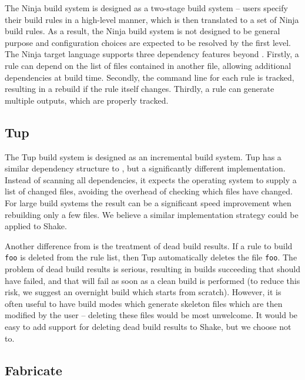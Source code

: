 
The Ninja build system \cite{ninja} is designed as a two-stage build system -- users specify their build rules in a high-level manner, which is then translated to a set of Ninja build rules. As a result, the Ninja build system is not designed to be general purpose and configuration choices are expected to be resolved by the first level. The Ninja target language supports three dependency features beyond \make{}. Firstly, a rule can depend on the list of files contained in another file, allowing additional dependencies at build time. Secondly, the command line for each rule is tracked, resulting in a rebuild if the rule itself changes. Thirdly, a rule can generate multiple outputs, which are properly tracked.

\subsection{Tup}


The Tup build system \cite{tup} is designed as an incremental build system. Tup has a similar dependency structure to \make{}, but a significantly different implementation. Instead of scanning all dependencies, it expects the operating system to supply a list of changed files, avoiding the overhead of checking which files have changed. For large build systems the result can be a significant speed improvement when rebuilding only a few files. We believe a similar implementation strategy could be applied to Shake.

Another difference from \make{} is the treatment of dead build results. If a rule to build \texttt{foo} is deleted from the rule list, then Tup automatically deletes the file \texttt{foo}. The problem of dead build results is serious, resulting in builds succeeding that should have failed, and that will fail as soon as a clean build is performed (to reduce this risk, we suggest an overnight build which starts from scratch). However, it is often useful to have build modes which generate skeleton files which are then modified by the user -- deleting these files would be most unwelcome. It would be easy to add support for deleting dead build results to Shake, but we choose not to.

\subsection{Fabricate}

